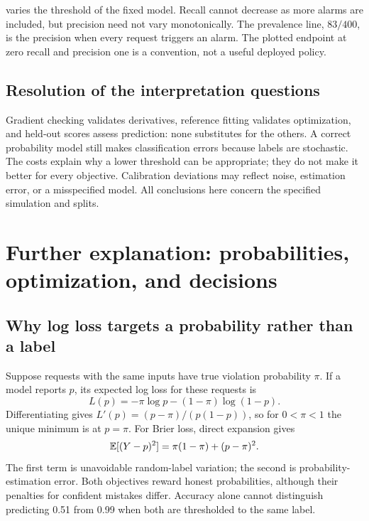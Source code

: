  varies the threshold of the fixed model. Recall cannot decrease as more alarms are included, but precision need not vary monotonically. The prevalence line, $83/400$, is the precision when every request triggers an alarm. The plotted endpoint at zero recall and precision one is a convention, not a useful deployed policy.

\subsection*{Resolution of the interpretation questions}
Gradient checking validates derivatives, reference fitting validates optimization, and held-out scores assess prediction: none substitutes for the others. A correct probability model still makes classification errors because labels are stochastic. The costs explain why a lower threshold can be appropriate; they do not make it better for every objective. Calibration deviations may reflect noise, estimation error, or a misspecified model. All conclusions here concern the specified simulation and splits.

\section*{Further explanation: probabilities, optimization, and decisions}
\subsection*{Why log loss targets a probability rather than a label}
Suppose requests with the same inputs have true violation probability $\pi$. If a model reports $p$, its expected
log loss for these requests is
\[L(p)=-\pi\log p-(1-\pi)\log(1-p).\]
Differentiating gives $L'(p)=(p-\pi)/(p(1-p))$, so for $0<\pi<1$ the unique minimum is at $p=\pi$.
For Brier loss, direct expansion gives
\[\mathbb{E}[(Y-p)^2]=\pi(1-\pi)+(p-\pi)^2.\]
The first term is unavoidable random-label variation; the second is probability-estimation error.
Both objectives reward honest probabilities, although their penalties for confident mistakes differ.
Accuracy alone cannot distinguish predicting 0.51 from 0.99 when both are thresholded to the same label.


